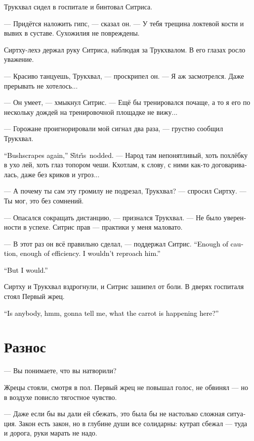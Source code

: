 \documentclass[a4paper,12pt,fleqn]{book}\usepackage{cooltooltips}\usepackage{polyglossia}\setdefaultlanguage[babelshorthands=true]{russian}\setotherlanguage{english}\defaultfontfeatures{Ligatures=TeX,Mapping=tex-text} \usepackage{xcolor}\definecolor{lightgray}{HTML}{bbbbbb}\color{lightgray}\newcommand{\ml}[3]{\textenglish{\textcolor{black}{#3}} }
\newcommand{\Sitris}{S\~{\i}tr\v{\i}s}
\begin{document}
Трукхвал сидел в госпитале и бинтовал Ситриса.

--- Придётся наложить гипс, --- сказал он.
--- У тебя трещина локтевой кости и вывих в суставе.
Сухожилия не повреждены.

Сиртху-лехэ держал руку Ситриса, наблюдая за Трукхвалом.
В его глазах росло уважение.

--- Красиво танцуешь, Трукхвал, --- проскрипел он.
--- Я аж засмотрелся.
Даже прерывать не хотелось...

--- Он умеет, --- хмыкнул Ситрис.
--- Ещё бы тренировался почаще, а то я его по нескольку дождей на тренировочной площадке не вижу...

--- Горожане проигнорировали мой сигнал два раза, --- грустно сообщил Трукхвал.

\ml{$0$}
{--- И опять Кустодралы, --- кивнул Ситрис.}
{``Bushscrapes again,'' \Sitris\ nodded.}
--- Народ там непонятливый, хоть похлёбку в ухо лей, хоть глаз топором чеши.
Кхотлам, к слову, с ними как-то договаривалась, даже без криков и угроз...

--- А почему ты сам эту громилу не подрезал, Трукхвал? --- спросил Сиртху.
--- Ты мог, это без сомнений.

--- Опасался сокращать дистанцию, --- признался Трукхвал.
--- Не было уверенности в успехе.
Ситрис прав --- практики у меня маловато.

--- В этот раз он всё правильно сделал, --- поддержал Ситрис.
\ml{$0$}
{--- В меру осторожно, в меру эффективно.}
{``Enough of caution, enough of efficiency.}
\ml{$0$}
{Претензий нет.}
{I wouldn't reproach him.''}

\ml{$0$}
{--- А у меня есть.}
{``But I would.''}

Сиртху и Трукхвал вздрогнули, и Ситрис зашипел от боли.
В дверях госпиталя стоял Первый жрец.

\ml{$0$}
{--- Кто-нибудь, ммм, собирается объяснить мне, что за морковка тут происходит?}
{``Is anybody, hmm, gonna tell me, what the carrot is happening here?''}

\section{Разнос}

--- Вы понимаете, что вы натворили?

Жрецы стояли, смотря в пол.
Первый жрец не повышал голос, не обвинял --- но в воздухе повисло тягостное чувство.

--- Даже если бы вы дали ей сбежать, это была бы не настолько сложная ситуация.
Закон есть закон, но в глубине души все солидарны: кутрап сбежал --- туда и дорога, руки марать не надо.
\end{document}
